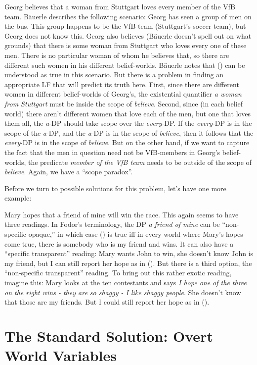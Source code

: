 \ex Georg believes that a woman from Stuttgart loves every member of the VfB team. \xe
%
Bäuerle describes the following scenario: Georg has seen a group of men on the
bus. This group happens to be the VfB team (Stuttgart's soccer team), but Georg
does not know this. Georg also believes (Bäuerle doesn't spell out on what
grounds) that there is some woman from Stuttgart who loves every one of these
men. There is no particular woman of whom he believes that, so there are
different such women in his different belief-worlds. Bäuerle notes that (\lastx)
can be understood as true in this scenario. But there is a problem in finding an
appropriate LF that will predict its truth here. First, since there are
different women in different belief-worlds of Georg's, the existential
quantifier \emph{a woman from Stuttgart} must be inside the scope of
\emph{believe}. Second, since (in each belief world) there aren't different
women that love each of the men, but one that loves them all, the \emph{a}-DP
should take scope over the \emph{every}-DP. If the \emph{every}-DP is in the
scope of the \emph{a}-DP, and the \emph{a}-DP is in the scope of \emph{believe},
then it follows that the \emph{every}-DP is in the scope of \emph{believe}. But
on the other hand, if we want to capture the fact that the men in question need
not be VfB-members in Georg's belief-worlds, the predicate \emph{member of the
  VfB team} needs to be outside of the scope of \emph{believe}. Again, we have a
``scope paradox''.

Before we turn to possible solutions for this problem, let's have one
more example:

\ex Mary hopes that a friend of mine will win the race. \xe
%
This again seems to have three readings. In Fodor's terminology, the DP \emph{a
  friend of mine} can be ``non-specific opaque,'' in which case (\lastx) is true
iff in every world where Mary's hopes come true, there is somebody who is my
friend and wins. It can also have a ``specific transparent'' reading: Mary wants
John to win, she doesn't know John is my friend, but I can still report her hope
as in (\lastx). But there is a third option, the ``non-specific transparent''
reading. To bring out this rather exotic reading, imagine this: Mary looks at
the ten contestants and says \emph{I hope one of the three on the right wins -
  they are so shaggy - I like shaggy people}. She doesn't know that those are my
friends. But I could still report her hope as in (\lastx).

\section{The Standard Solution: Overt World Variables}

